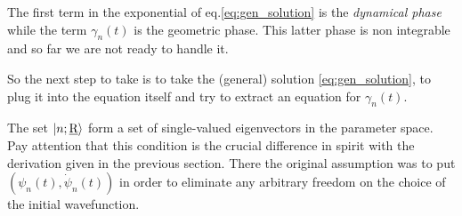 The first term in the exponential of eq.\eqref{eq:gen_solution} is the \emph{dynamical phase} while the term $ \gamma_n(t) $ is the geometric phase. This latter phase is non integrable and so far we are not ready to handle it.

So the next step to take is to take the (general) solution \eqref{eq:gen_solution}, to plug it into the \Sch equation itself and try to extract an equation for $ \gamma_n(t) $.
%
%
%
\begin{rem}
	The set $ \Ket{n;\underline{\textrm{R}}} $ form a set of single-valued eigenvectors in the parameter space. Pay attention that this condition is the crucial difference in spirit with the derivation given in the previous section. There the original assumption was to put $ \left(\psi_n(t),\dot{\psi}_n(t) \right) $ in order to eliminate any arbitrary freedom on the choice of the initial wavefunction.
\end{rem}


